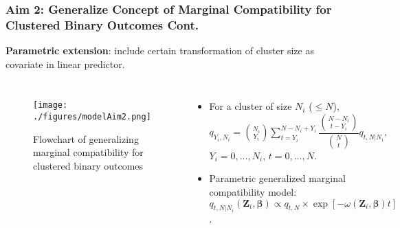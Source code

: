 \documentclass[hyperref={bookmarks=false},aspectratio=169]{beamer}
\begin{document}
\begin{frame}
\frametitle{Aim 2: Generalize Concept of Marginal Compatibility for Clustered Binary Outcomes Cont.}

\textbf{Parametric extension}: include certain transformation of cluster size as covariate in linear predictor.

\begin{columns}


\begin{figure}
    \centering
    \texttt{[image: ./figures/modelAim2.png]}
    \caption{Flowchart of generalizing marginal compatibility for clustered binary outcomes}
    \label{fig:Aim22}
\end{figure}

\begin{itemize}
    \item For a cluster of size $N_i$ ($\leq N$), \newline
    $q_{Y_i,N_i} =\binom{N_i}{Y_i} \displaystyle \sum_{t=Y_i}^{N-N_i+Y_i} \dfrac{\binom{N-N_i}{t-Y_i}} {\binom{N}{t}}$\alert{$q_{t,N|N_i}$}, $Y_i = 0, \dots, N_i$, $t=0, \dots, N$.
    \item \alert{Parametric generalized marginal compatibility model}: \newline
    $q_{t,N|N_i}\left( \boldsymbol{Z}_i, \boldsymbol{\beta} \right) \propto q_{t,N} \times \exp{ \left[ - \omega(\boldsymbol{Z}_i, \boldsymbol{\beta}) t \right]} $.
\end{itemize}

\end{columns}
\end{frame}
\end{document}
